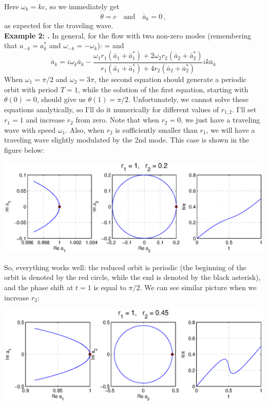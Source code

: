  Here $\omega_k = kc$, so we immediately get
\[ \dot{\theta} = c \quad \mathrm{and} \quad \dot{\bar{a}}_k = 0\,, \]
as expected for the traveling wave.\\
{\bf Example 2:  \Rpo.} In general, for the flow with two non-zero
modes (remembering that $a_{-k} = a_k^*$ and $\omega_{-k} =
-\omega_k$):
\beq
 \dot{\theta} = 
and
\[ \dot{\bar{a}}_k = i\omega_k \bar{a}_k - \frac{\omega_1 r_1 (\bar{a}_1 + \bar{a}_1^*) + 2\omega_2 r_2 (\bar{a}_2 + \bar{a}_2^*)}{r_1(\bar{a}_1 + \bar{a}_1^*) + 4r_2 (\bar{a}_2 + \bar{a}_2^*)}ik\bar{a}_k \]
When $\omega_1 = \pi/2$ and $\omega_2 = 3\pi$, the second equation should generate a periodic orbit with period $T = 1$, while the solution of the first equation, starting with $\theta(0) = 0$, should give us $\theta(1) = \pi/2$.  Unfortunately, we cannot solve these equations analytically, so I'll do it numerically for different values of $r_{1,2}$.  I'll set $r_1 = 1$ and increase $r_2$ from zero.  Note that when $r_2 = 0$, we just have a traveling wave with speed $\omega_1$.  Also, when $r_2$ is sufficiently smaller than $r_1$, we will have a traveling wave slightly modulated by the 2nd mode.  This case is shown in the figure below:

\vspace{2ex}\noindent\includegraphics[width=\textwidth]{sliceflow1}

So, everything works well: the reduced orbit is periodic (the beginning of the orbit is denoted by the red circle, while the end is denoted by the black asterisk), and the phase shift at $t = 1$ is equal to $\pi/2$.  We can see similar picture when we increase $r_2$:

\vspace{2ex}\noindent\includegraphics[width=\textwidth]{sliceflow2}


